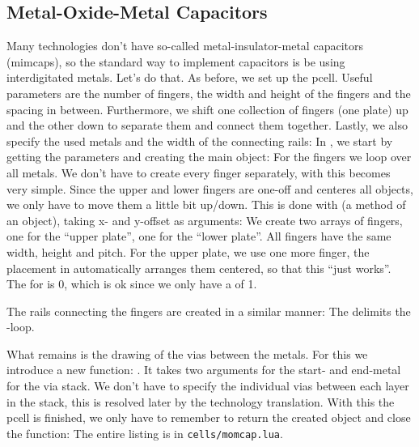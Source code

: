 \subsection{Metal-Oxide-Metal Capacitors}
Many technologies don't have so-called metal-insulator-metal capacitors (mimcaps), so the standard way to implement capacitors is be using interdigitated metals.
Let's do that. As before, we set up the pcell. Useful parameters are the number of fingers, the width and height of the fingers and the spacing in between.
Furthermore, we shift one collection of fingers (one plate) up and the other down to separate them and connect them together. Lastly, we also specify the used
metals and the width of the connecting rails:
In , we start by getting the parameters and creating the main object:
For the fingers we loop over all metals. We don't have to create every finger separately, with  this becomes very simple. Since the upper
and lower fingers are one-off and  centeres all objects, we only have to move them a little bit up/down. This is done with
 (a method of an object), taking x- and y-offset as arguments:
We create two arrays of fingers, one for the \enquote{upper plate}, one for the \enquote{lower plate}. All fingers have the same width, height and pitch. For the
upper plate, we use one more finger, the placement in  automatically arranges them centered, so that this \enquote{just works}.
The  for  is \num{0}, which is ok since we only have a  of \num{1}. 

The rails connecting the fingers are created in a similar manner:
The  delimits the -loop.

What remains is the drawing of the vias between the metals. For this we introduce a new  function: . It takes two
arguments for the start- and end-metal for the via stack. We don't have to specify the individual vias between each layer in the stack, this is resolved later by the
technology translation.
With this the pcell is finished, we only have to remember to return the created object and close the function:
The entire listing is in \texttt{cells/momcap.lua}.

